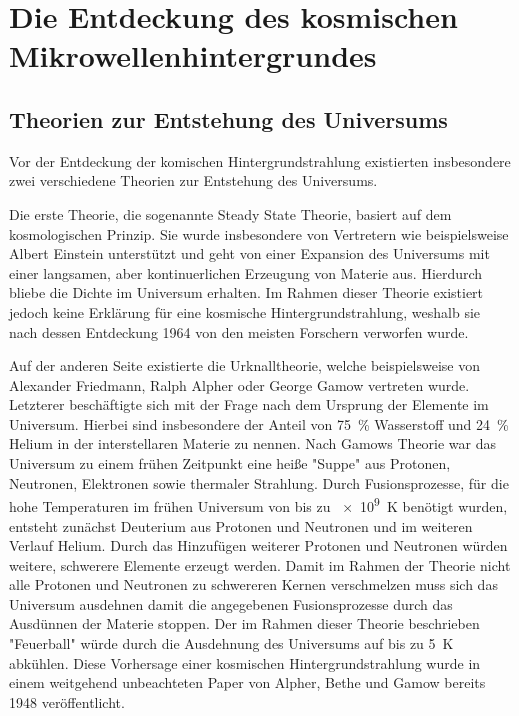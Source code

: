 
\section{Die Entdeckung des kosmischen Mikrowellenhintergrundes}


\subsection{Theorien zur Entstehung des Universums}

Vor der Entdeckung der komischen Hintergrundstrahlung existierten insbesondere zwei verschiedene Theorien zur Entstehung des Universums.

Die erste Theorie, die sogenannte Steady State Theorie, basiert auf dem kosmologischen Prinzip.
Sie wurde insbesondere von Vertretern wie beispielsweise Albert Einstein unterstützt und geht von einer Expansion des Universums mit einer langsamen, aber kontinuerlichen Erzeugung von Materie aus. 
Hierdurch bliebe die Dichte im Universum erhalten.
Im Rahmen dieser Theorie existiert jedoch keine Erklärung für eine kosmische Hintergrundstrahlung, weshalb sie nach dessen Entdeckung 1964 von den meisten Forschern verworfen wurde.

Auf der anderen Seite existierte die Urknalltheorie, welche beispielsweise von Alexander Friedmann, Ralph Alpher oder George Gamow vertreten wurde.
Letzterer beschäftigte sich mit der Frage nach dem Ursprung der Elemente im Universum.
Hierbei sind insbesondere der Anteil von \SI{75}{\percent} Wasserstoff und \SI{24}{\percent} Helium in der interstellaren Materie zu nennen.
Nach Gamows Theorie war das Universum zu einem frühen Zeitpunkt eine heiße "Suppe" aus Protonen, Neutronen, Elektronen sowie thermaler Strahlung.
Durch Fusionsprozesse, für die hohe Temperaturen im frühen Universum von bis zu \SI{e9}{\kelvin} benötigt wurden, entsteht zunächst Deuterium aus Protonen und Neutronen und im weiteren Verlauf Helium.
Durch das Hinzufügen weiterer Protonen und Neutronen würden weitere, schwerere Elemente erzeugt werden.
Damit im Rahmen der Theorie nicht alle Protonen und Neutronen zu schwereren Kernen verschmelzen muss sich das Universum ausdehnen damit die angegebenen Fusionsprozesse durch das Ausdünnen der Materie stoppen.
Der im Rahmen dieser Theorie beschrieben "Feuerball" würde durch die Ausdehnung des Universums auf bis zu \SI{5}{\kelvin} abkühlen.
Diese Vorhersage einer kosmischen Hintergrundstrahlung wurde in einem weitgehend unbeachteten Paper von Alpher, Bethe und Gamow bereits 1948 veröffentlicht. 

